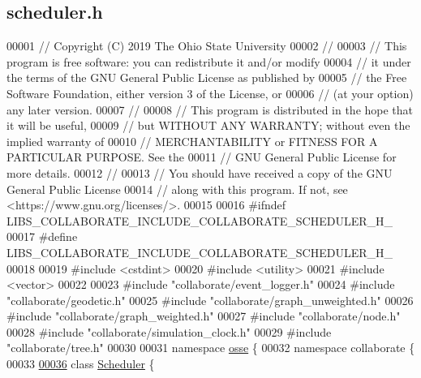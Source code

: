 \hypertarget{scheduler_8h_source}{}\subsection{scheduler.\+h}
\label{scheduler_8h_source}

\begin{DoxyCode}
00001 \textcolor{comment}{// Copyright (C) 2019 The Ohio State University}
00002 \textcolor{comment}{//}
00003 \textcolor{comment}{// This program is free software: you can redistribute it and/or modify}
00004 \textcolor{comment}{// it under the terms of the GNU General Public License as published by}
00005 \textcolor{comment}{// the Free Software Foundation, either version 3 of the License, or}
00006 \textcolor{comment}{// (at your option) any later version.}
00007 \textcolor{comment}{//}
00008 \textcolor{comment}{// This program is distributed in the hope that it will be useful,}
00009 \textcolor{comment}{// but WITHOUT ANY WARRANTY; without even the implied warranty of}
00010 \textcolor{comment}{// MERCHANTABILITY or FITNESS FOR A PARTICULAR PURPOSE.  See the}
00011 \textcolor{comment}{// GNU General Public License for more details.}
00012 \textcolor{comment}{//}
00013 \textcolor{comment}{// You should have received a copy of the GNU General Public License}
00014 \textcolor{comment}{// along with this program.  If not, see <https://www.gnu.org/licenses/>.}
00015 
00016 \textcolor{preprocessor}{#ifndef LIBS\_COLLABORATE\_INCLUDE\_COLLABORATE\_SCHEDULER\_H\_}
00017 \textcolor{preprocessor}{#define LIBS\_COLLABORATE\_INCLUDE\_COLLABORATE\_SCHEDULER\_H\_}
00018 
00019 \textcolor{preprocessor}{#include <cstdint>}
00020 \textcolor{preprocessor}{#include <utility>}
00021 \textcolor{preprocessor}{#include <vector>}
00022 
00023 \textcolor{preprocessor}{#include "collaborate/event\_logger.h"}
00024 \textcolor{preprocessor}{#include "collaborate/geodetic.h"}
00025 \textcolor{preprocessor}{#include "collaborate/graph\_unweighted.h"}
00026 \textcolor{preprocessor}{#include "collaborate/graph\_weighted.h"}
00027 \textcolor{preprocessor}{#include "collaborate/node.h"}
00028 \textcolor{preprocessor}{#include "collaborate/simulation\_clock.h"}
00029 \textcolor{preprocessor}{#include "collaborate/tree.h"}
00030 
00031 \textcolor{keyword}{namespace }\hyperlink{namespaceosse}{osse} \{
00032 \textcolor{keyword}{namespace }collaborate \{
00033 
\hyperlink{classosse_1_1collaborate_1_1_scheduler}{00036} \textcolor{keyword}{class }\hyperlink{classosse_1_1collaborate_1_1_scheduler}{Scheduler} \{

\end{DoxyCode}
